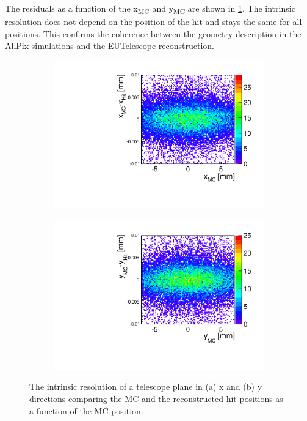 The residuals as a function of the x\textsubscript{MC} and
y\textsubscript{MC} are shown in \cref{fig:TelPlane0_MC_hit_2D}. The
intrinsic resolution does not depend on the position of the hit and
stays the same for all positions. This confirms the coherence between
the geometry description in the AllPix simulations and the EUTelescope
reconstruction.

\begin{figure}[htbp] \centering
  \begin{subfigure}[b]{0.45\textwidth}
    \includegraphics[width=\textwidth]{figures/Telescope/telescopePlane0_MC_vs_hit_x_2D.pdf}
    \caption{}
  \end{subfigure}\hfill
  \begin{subfigure}[b]{0.45\textwidth}
    \includegraphics[width=\textwidth]{figures/Telescope/telescopePlane0_MC_vs_hit_y_2D.pdf}
    \caption{}
  \end{subfigure}
  \caption{The intrinsic resolution of a telescope plane in (a) x and
    (b) y directions comparing the MC and the reconstructed
    hit positions as a function of the MC position.}
  \label{fig:TelPlane0_MC_hit_2D}
\end{figure}


